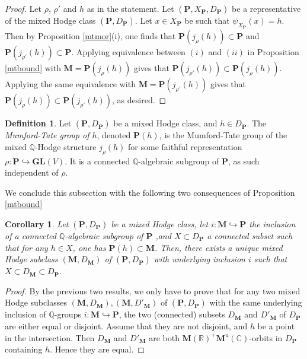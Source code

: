 \documentclass[10pt]{article}
\numberwithin{equation}{subsection}
\theoremstyle{plain}
\newtheorem{corollary}[theorem]{Corollary}
\theoremstyle{definition}
\newtheorem{definition}[theorem]{Definition}
\theoremstyle{remark}
\newcommand{\Q}{\mathbb Q}
\newcommand{\C}{\mathbb C}
\newcommand{\R}{\mathbb R}
\newcommand{\pp}{\mathbf P}
\newcommand{\M}{\mathbf M}
\newcommand{\gl}{\mathbf{GL}}
\begin{document}
\begin{proof}
Let $\rho$, $\rho'$ and $h$ as in the statement. Let $(\pp, X_\pp, D_\pp)$ be a representative of the mixed Hodge class $(\pp, D_\pp)$. Let $x \in X_\pp$ be such that $\psi_{X_\pp}(x) = h$. Then by Proposition \ref{mtmor}(i), one finds that $\pp(j_\rho(h)) \subset \pp$ and $\pp(j_{\rho'}(h)) \subset \pp$. Applying equivalence between $(i)$ and $(ii)$ in Proposition \ref{mtbound} with $\M = \pp(j_\rho(h))$ gives that $\pp(j_{\rho'}(h)) \subset \pp(j_{\rho}(h))$. Applying the same equivalence with $\M = \pp(j_{\rho'}(h))$ gives that $\pp(j_\rho(h)) \subset \pp(j_{\rho'}(h))$, as desired.
\end{proof}
\begin{definition}
Let $(\pp, D_\pp)$ be a mixed Hodge class, and $h \in D_\pp$. The \textit{Mumford-Tate group of $h$}, denoted $\pp(h)$, is the Mumford-Tate group of the mixed $\Q$-Hodge structure $j_\rho(h)$ for some faithful representation $\rho : \pp \hookrightarrow \gl(V)$. It is a connected $\Q$-algebraic subgroup of $\pp$, as such independent of $\rho$.
\end{definition}
We conclude this subsection with the following two consequences of Proposition \ref{mtbound}
\begin{corollary}\label{mtconn}
Let $(\pp, D_\pp)$ be a mixed Hodge class, let $i : \M \hookrightarrow \pp$ the inclusion of a connected $\Q$-algebraic subgroup of $\pp$ ,and $X \subset D_\pp$ a connected subset such that for any $h \in X$, one has $\pp(h) \subset \M$. Then, there exists a unique mixed Hodge subclass $(\M,D_\M)$ of $(\pp, D_\pp)$ with underlying inclusion $i$ such that $X \subset D_\M \subset D_\pp$.
\end{corollary}
\begin{proof}
By the previous two results, we only have to prove that for any two mixed Hodge subclasses $(\M,D_\M), (\M,D'_{\M})$ of $(\pp, D_\pp)$ with the same underlying inclusion of $\Q$-groups $i : \M \hookrightarrow \pp$, the two (connected) subsets $D_\M$ and $D'_\M$ of $D_\pp$ are either equal or disjoint. Assume that they are not disjoint, and $h$ be a point in the intersection. Then $D_\M$ and $D'_\M$ are both $\M(\R)^+\M^u(\C)$-orbits in $D_\pp$ containing $h$. Hence they are equal.
\end{proof}
\end{document}
